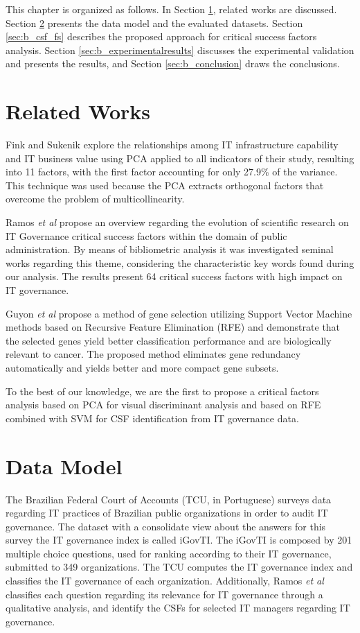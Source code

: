 This chapter is organized as follows. In Section \ref{sec:b_relatedworks}, related works are discussed. Section \ref{sec:b_datamodel} presents the data model and the evaluated datasets. Section \ref{sec:b_csf_fs} describes the proposed approach for critical success factors analysis. Section \ref{sec:b_experimentalresults} discusses the experimental validation and presents the results, and Section \ref{sec:b_conclusion} draws the conclusions.


\section{Related Works}
\label{sec:b_relatedworks}

Fink and Sukenik \cite{fink2011effect} explore the relationships among IT infrastructure capability and IT business value using PCA applied to all indicators of their study, resulting into 11 factors, with the first factor accounting for only 27.9\% of the variance. This technique was used because the PCA extracts orthogonal factors that overcome the problem of multicollinearity.

Ramos \emph{et al} \cite{ramos2016information} propose an overview regarding the evolution of scientific research on IT Governance critical success factors within the domain of public administration. By means of bibliometric analysis it was investigated seminal works regarding this theme, considering the characteristic key words found during our analysis. The results present 64 critical success factors with high impact on IT governance.

Guyon \emph{et al} \cite{guyon2002gene} propose a method of gene selection utilizing Support Vector Machine methods based on Recursive Feature Elimination (RFE) and demonstrate that the selected genes yield better classification performance and are biologically relevant to cancer.  The proposed method eliminates gene redundancy automatically and yields better and more compact gene subsets. 

To the best of our knowledge, we are the first to propose a critical factors analysis based on PCA for visual discriminant analysis and based on RFE combined with SVM for CSF identification from IT governance data.


\section{Data Model}
\label{sec:b_datamodel}

The Brazilian Federal Court of Accounts (TCU, in Portuguese) surveys data regarding IT practices of Brazilian public organizations in order to audit IT governance. The dataset with a consolidate view about the answers for this survey the IT governance index is called iGovTI. The iGovTI is composed by 201 multiple choice questions, used for ranking according to their IT governance, submitted to 349 organizations. The TCU computes the IT governance index and classifies the IT governance of each organization. Additionally, Ramos \emph{et al} \cite{ramos2016information} classifies each question regarding its relevance for IT governance through a qualitative analysis, and identify the CSFs for selected IT managers regarding IT governance.



